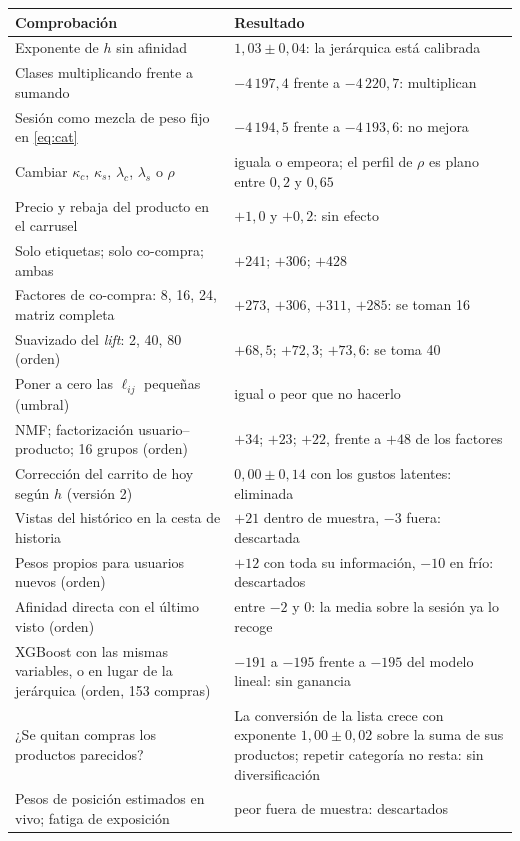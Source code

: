 \documentclass[11pt,a4paper]{article}
\begin{document}
\begin{center}
\small
\begin{longtable}{@{}p{7.9cm}p{7.4cm}@{}}
\toprule
Comprobación & Resultado\\
\midrule
\endhead
Exponente de $h$ sin afinidad & $1{,}03\pm0{,}04$: la jerárquica está calibrada\\
Clases multiplicando frente a sumando & $-4\,197{,}4$ frente a $-4\,220{,}7$: multiplican\\
Sesión como mezcla de peso fijo en \eqref{eq:cat} & $-4\,194{,}5$ frente a $-4\,193{,}6$: no mejora\\
Cambiar $\kappa_c$, $\kappa_s$, $\lambda_c$, $\lambda_s$ o $\rho$ & iguala o empeora; el perfil de $\rho$ es plano entre $0{,}2$ y $0{,}65$\\
Precio y rebaja del producto en el carrusel & $+1{,}0$ y $+0{,}2$: sin efecto\\
Solo etiquetas; solo co-compra; ambas & $+241$; $+306$; $+428$\\
Factores de co-compra: 8, 16, 24, matriz completa & $+273$, $+306$, $+311$, $+285$: se toman 16\\
Suavizado del \emph{lift}: 2, 40, 80 (orden) & $+68{,}5$; $+72{,}3$; $+73{,}6$: se toma 40\\
Poner a cero las $\ell_{ij}$ pequeñas (umbral) & igual o peor que no hacerlo\\
NMF; factorización usuario--producto; 16 grupos (orden) & $+34$; $+23$; $+22$, frente a $+48$ de los factores\\
Corrección del carrito de hoy según $h$ (versión 2) & $0{,}00\pm0{,}14$ con los gustos latentes: eliminada\\
Vistas del histórico en la cesta de historia & $+21$ dentro de muestra, $-3$ fuera: descartada\\
Pesos propios para usuarios nuevos (orden) & $+12$ con toda su información, $-10$ en frío: descartados\\
Afinidad directa con el último visto (orden) & entre $-2$ y $0$: la media sobre la sesión ya lo recoge\\
XGBoost con las mismas variables, o en lugar de la jerárquica (orden, 153 compras) & $-191$ a $-195$ frente a $-195$ del modelo lineal: sin ganancia\\
¿Se quitan compras los productos parecidos? & La conversión de la lista crece con exponente $1{,}00\pm0{,}02$ sobre la suma de sus productos; repetir categoría no resta: sin diversificación\\
Pesos de posición estimados en vivo; fatiga de exposición & peor fuera de muestra: descartados\\

\end{longtable}
\end{center}
\end{document}
